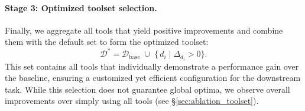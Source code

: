 \paragraph{Stage 3: Optimized toolset selection.}
Finally, we aggregate all tools that yield positive improvements and combine them with the default set to form the optimized toolset:
\begin{equation}
\mathcal{D}^* = \mathcal{D}_\text{base}\;\cup\;\{\, d_i \mid \Delta_{d_i} > 0 \}.
\end{equation}
This set contains all tools that individually demonstrate a performance gain over the baseline, ensuring a customized yet efficient configuration for the downstream task. While this selection does not guarantee global optima, we observe overall improvements over simply using all tools (see \S\ref{sec:ablation_toolset}).


